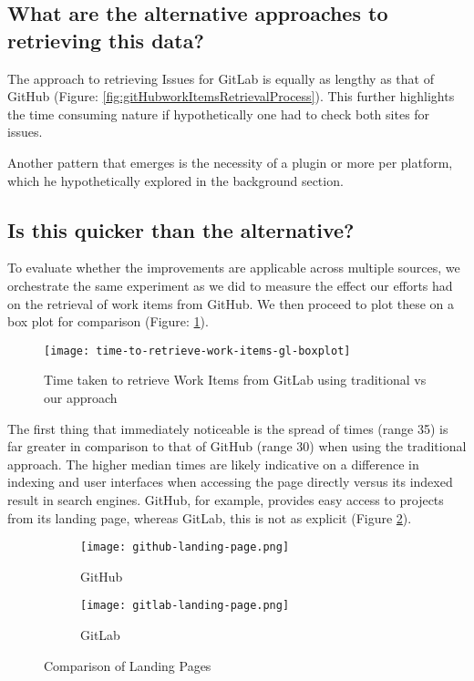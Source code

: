 \subsection{What are the alternative approaches to retrieving this data?}

The approach to retrieving Issues for GitLab is equally as lengthy as that of GitHub (Figure: \ref{fig:gitHubworkItemsRetrievalProcess}). This further highlights the time consuming nature if hypothetically one had to check both sites for issues.

Another pattern that emerges is the necessity of a plugin or more per platform, which he hypothetically explored in the background section.

\subsection{Is this quicker than the alternative?}

To evaluate whether the improvements are applicable across multiple sources, we orchestrate the same experiment as we did to measure the effect our efforts had on the retrieval of work items from GitHub. We then proceed to plot these on a box plot for comparison (Figure: \ref{fig:time-to-retrieve-work-items-gl-boxplot}).

\begin{figure}[h!]
	\centering
	\texttt{[image: time-to-retrieve-work-items-gl-boxplot]}
	\caption{Time taken to retrieve Work Items from GitLab using traditional vs our approach}
	\label{fig:time-to-retrieve-work-items-gl-boxplot}
\end{figure}

The first thing that immediately noticeable is the spread of times (range 35) is far greater in comparison to that of GitHub (range 30) when using the traditional approach. The higher median times are likely indicative on a difference in indexing and user interfaces when accessing the page directly versus its indexed result in search engines. GitHub, for example, provides easy access to projects from its landing page, whereas GitLab, this is not as explicit (Figure \ref{fig:comparisonOfLandingPagesForGhVsGL}).

\begin{figure}[h!]
	\centering
	\begin{subfigure}[t]{0.49\textwidth}
		\texttt{[image: github-landing-page.png]}
		\caption{GitHub}
	\end{subfigure}
	\begin{subfigure}[t]{0.49\textwidth}
		\texttt{[image: gitlab-landing-page.png]}
		\caption{GitLab}
	\end{subfigure}
	\caption{Comparison of Landing Pages}
	\label{fig:comparisonOfLandingPagesForGhVsGL}
\end{figure}

